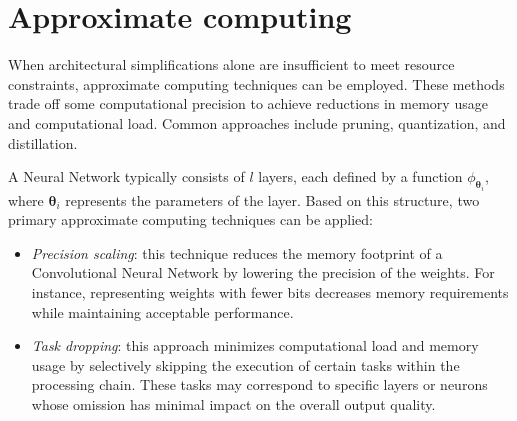 \section{Approximate computing}

When architectural simplifications alone are insufficient to meet resource constraints, approximate computing techniques can be employed. 
These methods trade off some computational precision to achieve reductions in memory usage and computational load. 
Common approaches include pruning, quantization, and distillation.

A Neural Network typically consists of $l$ layers, each defined by a function $\phi_{\boldsymbol{\theta}_i}$, where $\boldsymbol{\theta}_i$ represents the parameters of the layer.
Based on this structure, two primary approximate computing techniques can be applied:
\begin{itemize}
    \item \textit{Precision scaling}: this technique reduces the memory footprint of a Convolutional Neural Network by lowering the precision of the weights.
        For instance, representing weights with fewer bits decreases memory requirements while maintaining acceptable performance.
    \item \textit{Task dropping}: this approach minimizes computational load and memory usage by selectively skipping the execution of certain tasks within the processing chain.
        These tasks may correspond to specific layers or neurons whose omission has minimal impact on the overall output quality.
\end{itemize}

